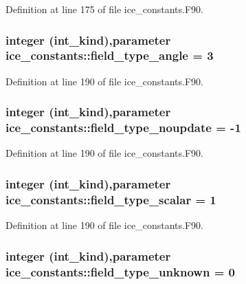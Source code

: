 Definition at line 175 of file ice\_\-constants.F90.\hypertarget{namespaceice__constants_a3986aa54de6be9d32605fc28334dff02}{
\subsubsection[{field\_\-type\_\-angle}]{\setlength{\rightskip}{0pt plus 5cm}integer (int\_\-kind),parameter {\bf ice\_\-constants::field\_\-type\_\-angle} = 3}}
\label{namespaceice__constants_a3986aa54de6be9d32605fc28334dff02}


Definition at line 190 of file ice\_\-constants.F90.\hypertarget{namespaceice__constants_a113ccc2c17076b3fce46d2a4d7f2b1c2}{
\subsubsection[{field\_\-type\_\-noupdate}]{\setlength{\rightskip}{0pt plus 5cm}integer (int\_\-kind),parameter {\bf ice\_\-constants::field\_\-type\_\-noupdate} = -\/1}}
\label{namespaceice__constants_a113ccc2c17076b3fce46d2a4d7f2b1c2}


Definition at line 190 of file ice\_\-constants.F90.\hypertarget{namespaceice__constants_a98992b4bfb499ea1f7a0f6037c17a100}{
\subsubsection[{field\_\-type\_\-scalar}]{\setlength{\rightskip}{0pt plus 5cm}integer (int\_\-kind),parameter {\bf ice\_\-constants::field\_\-type\_\-scalar} = 1}}
\label{namespaceice__constants_a98992b4bfb499ea1f7a0f6037c17a100}


Definition at line 190 of file ice\_\-constants.F90.\hypertarget{namespaceice__constants_ab690b4d66447609212d302c0fe485dda}{
\subsubsection[{field\_\-type\_\-unknown}]{\setlength{\rightskip}{0pt plus 5cm}integer (int\_\-kind),parameter {\bf ice\_\-constants::field\_\-type\_\-unknown} = 0}}
\label{namespaceice__constants_ab690b4d66447609212d302c0fe485dda}


